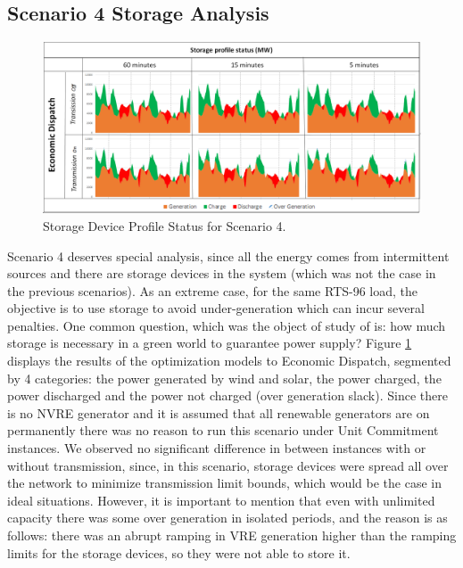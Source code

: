 \documentclass[12pt,LUDisStyle,twosided]{book}
\begin{document}
\newpage
\subsection{Scenario 4 Storage Analysis}

\begin{figure}[H] 
	\begin{center}
		\includegraphics[width=\textwidth,keepaspectratio]{StorageProfileStatusS4.png}
	  	\caption{Storage Device Profile Status for Scenario 4.}
     	\label{fig:storageprofilestatus}
	\end{center}
\end{figure}

Scenario 4 deserves special analysis, since all the energy comes from intermittent sources and there are storage devices in the system (which was not the case in the previous scenarios). As an extreme case, for the same RTS-96 load, the objective is to use storage to avoid under-generation which can incur several penalties. One common question, which was the object of study of \citeauthor{safaei} \cite{safaei} is: how much storage is necessary in a green world to guarantee power supply? Figure \ref{fig:storageprofilestatus} displays the results of the optimization models to Economic Dispatch, segmented by 4 categories: the power generated by wind and solar, the power charged, the power discharged and the power not charged (over generation slack). Since there is no NVRE generator and it is assumed that all renewable generators are on permanently there was no reason to run this scenario under Unit Commitment instances. We observed no significant difference in between instances with or without transmission, since, in this scenario, storage devices were spread all over the network to minimize transmission limit bounds, which would be the case in ideal situations. However, it is important to mention that even with unlimited capacity there was some over generation in isolated periods, and the reason is as follows: there was an abrupt ramping in VRE generation higher than the ramping limits for the storage devices, so they were not able to store it. 
\end{document}
